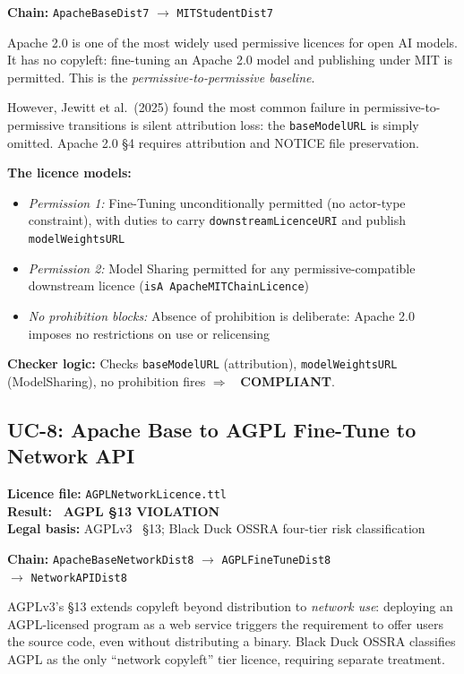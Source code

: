 \documentclass[12pt,a4paper]{article}
\newcommand{\compliant}{\textcolor{compliant}{\textbf{\checkmark\ COMPLIANT}}}
\newcommand{\violated}[1]{\textcolor{violation}{\textbf{\texttimes\ #1}}}
\begin{document}
\textbf{Chain:} \texttt{ApacheBaseDist7} $\rightarrow$ \texttt{MITStudentDist7}

Apache 2.0 is one of the most widely used permissive licences for open AI models. It has no copyleft: fine-tuning an Apache 2.0 model and publishing under MIT is permitted. This is the \emph{permissive-to-permissive baseline}.

However, Jewitt et al.\ (2025) found the most common failure in permissive-to-permissive transitions is silent attribution loss: the \texttt{baseModelURL} is simply omitted. Apache 2.0 \S 4 requires attribution and NOTICE file preservation.

\textbf{The licence models:}
\begin{itemize}[noitemsep]
  \item \emph{Permission 1:} Fine-Tuning unconditionally permitted (no actor-type constraint), with duties to carry \texttt{downstreamLicenceURI} and publish \texttt{modelWeightsURL}
  \item \emph{Permission 2:} Model Sharing permitted for any permissive-compatible downstream licence (\texttt{isA ApacheMITChainLicence})
  \item \emph{No prohibition blocks:} Absence of prohibition is deliberate: Apache 2.0 imposes no restrictions on use or relicensing
\end{itemize}

\textbf{Checker logic:} Checks \texttt{baseModelURL} (attribution), \texttt{modelWeightsURL} (ModelSharing), no prohibition fires $\Rightarrow$ \compliant.

\subsection{UC-8: Apache Base to AGPL Fine-Tune to Network API}
\textbf{Licence file:} \texttt{AGPLNetworkLicence.ttl}\\[2pt]
\textbf{Result:} \violated{AGPL \S 13 VIOLATION}\\[4pt]
\textbf{Legal basis:} AGPLv3~\cite{agplv3} \S 13; Black Duck OSSRA four-tier risk classification

\textbf{Chain:} \texttt{ApacheBaseNetworkDist8} $\rightarrow$ \texttt{AGPLFineTuneDist8}\\
\quad$\rightarrow$ \texttt{NetworkAPIDist8}

AGPLv3's \S 13 extends copyleft beyond distribution to \emph{network use}: deploying an AGPL-licensed program as a web service triggers the requirement to offer users the source code, even without distributing a binary. Black Duck OSSRA classifies AGPL as the only ``network copyleft'' tier licence, requiring separate treatment.
\end{document}
